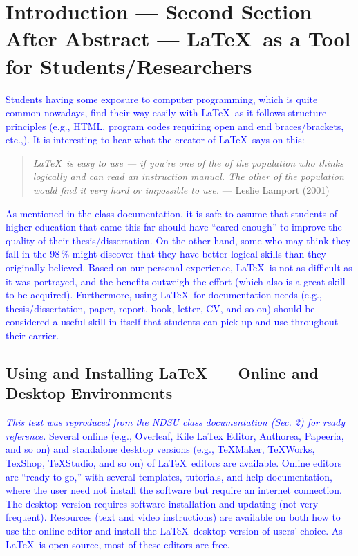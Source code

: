 \documentclass[phd,showgrids]{ndsu-thesis-2022}
\newcommand\italk[1]{\textcolor{blue}{#1}}  %
\begin{document}
\vspace{-5ex}
\section{Introduction --- Second Section After Abstract --- \LaTeX\ as a Tool for Students/Researchers}
\italk{Students having some exposure to computer programming, which is quite common nowadays, find their way easily with \LaTeX\ as it follows structure principles (e.g., HTML, program codes requiring open and end braces/brackets, etc.,). It is interesting to hear what the creator of \LaTeX\ says on this:} 
\textcolor{magenta}{
\begin{quote}
\singlespacing
\raggedright
\textit{
\LaTeX\ is easy to use --- if you're one of the  of the population who thinks logically and can read an instruction manual. The other  of the population would find it very hard or impossible to use.} 
\hfill --- Leslie Lamport (2001)
\end{quote}
}

\italk{As mentioned in the class documentation, it is safe to assume that students of higher education that came this far should have ``cared enough'' to improve the quality of their thesis/dissertation. On the other hand, some who may think they fall in the 98\,\% might discover that they have better logical skills than they originally believed. Based on our personal experience, \LaTeX\ is not as difficult as it was portrayed, and the benefits outweigh the effort (which also is a great skill to be acquired). Furthermore, using \LaTeX\ for documentation needs (e.g., thesis/dissertation, paper, report, book, letter, CV, and so on) should be considered a useful skill in itself that students can pick up and use throughout their carrier. 
} 

\subsection{Using and Installing \LaTeX\  --- Online and Desktop Environments}  
\italk{\emph{This text was reproduced from the NDSU class documentation (Sec. 2) for ready reference.} Several online (e.g., Overleaf, Kile LaTex Editor, Authorea, Papeeria, and so on) and standalone desktop versions (e.g., TeXMaker, TeXWorks, TexShop, TeXStudio, and so on) of \LaTeX\ editors are available. Online editors are ``ready-to-go,'' with several templates, tutorials, and help documentation, where the user need not install the software but require an internet connection. The desktop version requires software installation and updating (not very frequent). Resources (text and video instructions) are available on both how to use the online editor and install the \LaTeX\ desktop version of users' choice. As \LaTeX\ is open source, most of these editors are free.}
\end{document}

